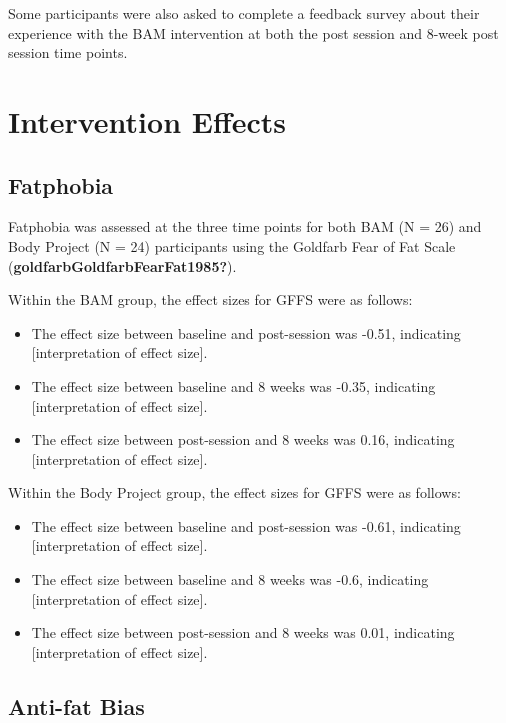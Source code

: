 \documentclass[
  letterpaper,
  DIV=11,
  numbers=noendperiod]{scrreprt}
\begin{document}
Some participants were also asked to complete a feedback survey about
their experience with the BAM intervention at both the post session and
8-week post session time points.


\hypertarget{intervention-effects}{%
\chapter{Intervention Effects}\label{intervention-effects}}

\hypertarget{fatphobia}{%
\section{Fatphobia}\label{fatphobia}}

Fatphobia was assessed at the three time points for both BAM (N = 26)
and Body Project (N = 24) participants using the Goldfarb Fear of Fat
Scale (\textbf{goldfarbGoldfarbFearFat1985?}).

Within the BAM group, the effect sizes for GFFS were as follows:

\begin{itemize}
\item
  The effect size between baseline and post-session was -0.51,
  indicating {[}interpretation of effect size{]}.
\item
  The effect size between baseline and 8 weeks was -0.35, indicating
  {[}interpretation of effect size{]}.
\item
  The effect size between post-session and 8 weeks was 0.16, indicating
  {[}interpretation of effect size{]}.
\end{itemize}

Within the Body Project group, the effect sizes for GFFS were as
follows:

\begin{itemize}
\item
  The effect size between baseline and post-session was -0.61,
  indicating {[}interpretation of effect size{]}.
\item
  The effect size between baseline and 8 weeks was -0.6, indicating
  {[}interpretation of effect size{]}.
\item
  The effect size between post-session and 8 weeks was 0.01, indicating
  {[}interpretation of effect size{]}.
\end{itemize}

\hypertarget{anti-fat-bias}{%
\section{Anti-fat Bias}\label{anti-fat-bias}}
\end{document}
